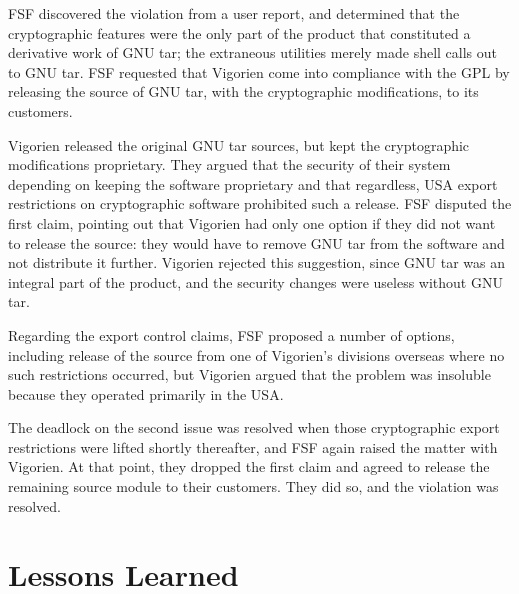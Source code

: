FSF discovered the violation from a user report, and determined that the
cryptographic features were the only part of the product that constituted
a derivative work of GNU tar; the extraneous utilities merely made
shell calls out to GNU tar. FSF requested that Vigorien come into
compliance with the GPL by releasing the source of GNU tar, with the
cryptographic modifications, to its customers.

Vigorien released the original GNU tar sources, but kept the cryptographic
modifications proprietary. They argued that the security of their system
depending on keeping the software proprietary and that regardless, USA
export restrictions on cryptographic software prohibited such a release.
FSF disputed the first claim, pointing out that Vigorien had only one
option if they did not want to release the source: they would have to
remove GNU tar from the software and not distribute it further. Vigorien
rejected this suggestion, since GNU tar was an integral part of the
product, and the security changes were useless without GNU tar.

Regarding the export control claims, FSF proposed a number of options,
including release of the source from one of Vigorien's divisions overseas
where no such restrictions occurred, but Vigorien argued that the problem
was insoluble because they operated primarily in the USA\@.

The deadlock on the second issue was resolved when those cryptographic
export restrictions were lifted shortly thereafter, and FSF again raised
the matter with Vigorien. At that point, they dropped the first claim and
agreed to release the remaining source module to their customers. They
did so, and the violation was resolved.


\section{Lessons Learned}

